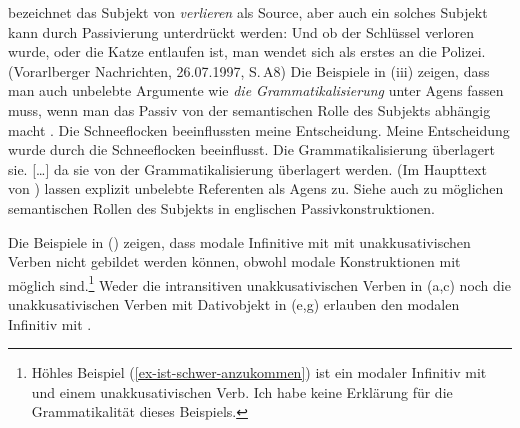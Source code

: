 {\citet[]{Abraham2005a} bezeichnet das Subjekt von \emph{verlieren} als Source, aber auch ein
solches Subjekt kann durch Passivierung unterdrückt werden:
\ea
Und ob der Schlüssel verloren wurde, oder die Katze entlaufen ist, man wendet sich als erstes an die Polizei.
(Vorarlberger Nachrichten, 26.07.1997, S.\,A8)
\z
        Die Beispiele in (iii) zeigen, dass man auch unbelebte 
        Argumente wie \emph{die Grammatikalisierung} unter Agens fassen muss, wenn
        man das Passiv von der semantischen Rolle des Subjekts abhängig macht \citep[Abschnitt~3.1.2]{Mueller2002b}.
        \eal
\ex Die Schneeflocken beeinflussten meine Entscheidung.
\ex Meine Entscheidung wurde durch die Schneeflocken beeinflusst.
\ex Die Grammatikalisierung überlagert sie.
\ex {} [\ldots] da    sie  von der Grammatikalisierung überlagert werden. (Im Haupttext von )
\zl
        \citet[]{HW95a} lassen explizit unbelebte Referenten als Agens zu.
        Siehe auch  zu möglichen semantischen Rollen des Subjekts in
        englischen Passivkonstruktionen.%
}

Die Beispiele in () zeigen, dass modale Infinitive mit \sein mit unakkusativischen
Verben nicht gebildet werden können, obwohl modale Konstruktionen mit \haben möglich sind.\footnote{
        Höhles Beispiel (\ref{ex-ist-schwer-anzukommen}) ist ein modaler Infinitiv mit
        \sein und einem unakkusativischen Verb. Ich habe keine Erklärung für die Grammatikalität dieses Beispiels.
}
\eal
{}
\zl
Weder die intransitiven unakkusativischen Verben in (a,c) noch die
unakkusativischen Verben mit Dativobjekt in (e,g) erlauben 
den modalen Infinitiv mit \sein.

